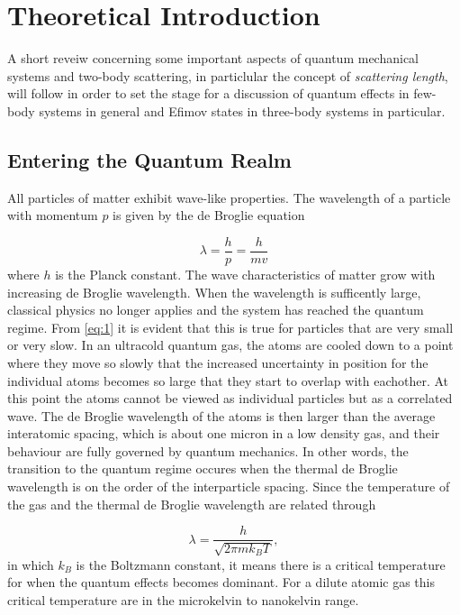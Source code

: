 \section{Theoretical Introduction}
A short reveiw concerning some important aspects of quantum mechanical systems and two-body scattering, in particlular the concept of \emph{scattering length}, will follow in order to set the stage for a discussion of quantum effects in few-body systems in general and Efimov states in three-body systems in particular. 

\subsection{Entering the Quantum Realm}
All particles of matter exhibit wave-like properties. The wavelength of a particle with momentum $p$ is given by the de Broglie equation

\begin{equation} \label{eq:1}
\lambda = \frac{h}{p} = \frac{h}{mv}
\end{equation}
where $h$ is the Planck constant. The wave characteristics of matter grow with increasing de Broglie wavelength. When the wavelength is sufficently large, classical physics no longer applies and the system has reached the quantum regime. From \ref{eq:1} it is evident that this is true for particles that are very small or very slow. In an ultracold quantum gas, the atoms are cooled down to a point where they move so slowly that the increased uncertainty in position for the individual atoms becomes so large that they start to overlap with eachother. At this point the atoms cannot be viewed as individual particles but as a correlated wave. The de Broglie wavelength of the atoms is then larger than the average interatomic spacing, which is about one micron in a low density gas, and their behaviour are fully governed by quantum mechanics. In other words, the transition to the quantum regime occures when the thermal de Broglie wavelength is on the order of the interparticle spacing. Since the temperature of the gas and the thermal de Broglie wavelength are related through

\begin{equation}
\lambda = \frac{h}{\sqrt{2\pi m k_B T}},
\end{equation}
in which $k_B$ is the Boltzmann constant, it means there is a critical temperature for when the quantum effects becomes dominant. For a dilute atomic gas this critical temperature are in the microkelvin to nanokelvin range.

